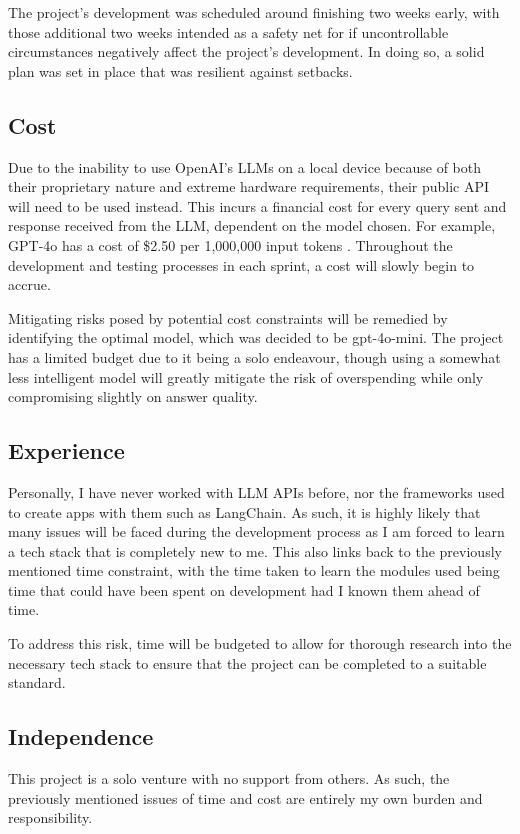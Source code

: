 \para The project's development was scheduled around finishing two weeks early, with those additional two weeks intended as a safety 
net for if uncontrollable circumstances negatively affect the project's development. In doing so, a solid plan was set in place that 
was resilient against setbacks. 

\subsection{Cost}
Due to the inability to use OpenAI's LLMs on a local device because of both their proprietary nature and extreme hardware requirements,
their public API will need to be used instead. This incurs a financial cost for every query sent and response received from the LLM,
dependent on the model chosen. For example, GPT-4o has a cost of \$2.50 per 1,000,000 input tokens \autocite{openaiPricingOpenAIAPI}.
Throughout the development and testing processes in each sprint, a cost will slowly begin to accrue.

\para Mitigating risks posed by potential cost constraints will be remedied by identifying the optimal model, which was decided to 
be gpt-4o-mini. The project has a limited budget due to it being a solo endeavour, though using a somewhat less intelligent model 
will greatly mitigate the risk of overspending while only compromising slightly on answer quality. 

\subsection{Experience}
Personally, I have never worked with LLM APIs before, nor the frameworks used to create apps with them such as LangChain. As such,
it is highly likely that many issues will be faced during the development process as I am forced to learn a tech stack that is completely 
new to me. This also links back to the previously mentioned time constraint, with the time taken to learn the modules used being time that 
could have been spent on development had I known them ahead of time.

\para To address this risk, time will be budgeted to allow for thorough research into the necessary tech stack to ensure that the project 
can be completed to a suitable standard.

\subsection{Independence}
This project is a solo venture with no support from others. As such, the previously mentioned issues of time and cost are entirely 
my own burden and responsibility. 

